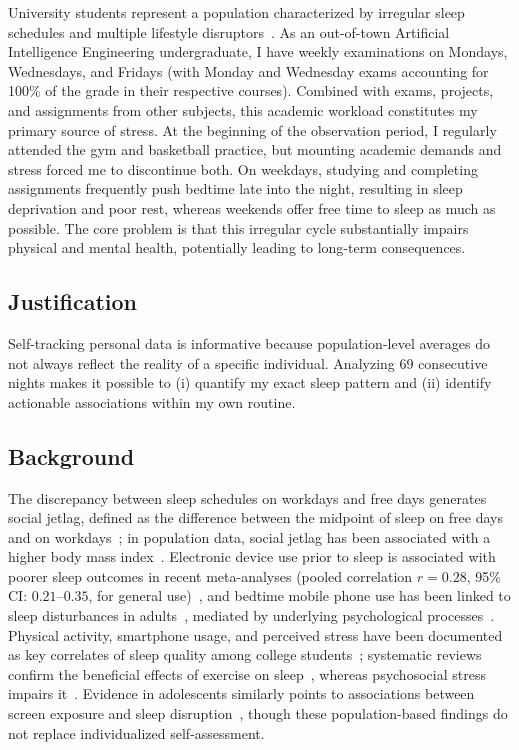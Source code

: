 \documentclass[conference]{IEEEtran}
\begin{document}
University students represent a population characterized by irregular sleep schedules and multiple lifestyle disruptors~\cite{ref5,ref6}. As an out-of-town Artificial Intelligence Engineering undergraduate, I have weekly examinations on Mondays, Wednesdays, and Fridays (with Monday and Wednesday exams accounting for 100\% of the grade in their respective courses). Combined with exams, projects, and assignments from other subjects, this academic workload constitutes my primary source of stress. At the beginning of the observation period, I regularly attended the gym and basketball practice, but mounting academic demands and stress forced me to discontinue both. On weekdays, studying and completing assignments frequently push bedtime late into the night, resulting in sleep deprivation and poor rest, whereas weekends offer free time to sleep as much as possible. The core problem is that this irregular cycle substantially impairs physical and mental health, potentially leading to long-term consequences.

\subsection{Justification}
Self-tracking personal data is informative because population-level averages do not always reflect the reality of a specific individual. Analyzing 69 consecutive nights makes it possible to (i) quantify my exact sleep pattern and (ii) identify actionable associations within my own routine.

\subsection{Background}
The discrepancy between sleep schedules on workdays and free days generates social jetlag, defined as the difference between the midpoint of sleep on free days and on workdays~\cite{ref8}; in population data, social jetlag has been associated with a higher body mass index~\cite{ref9}. Electronic device use prior to sleep is associated with poorer sleep outcomes in recent meta-analyses (pooled correlation $r=0.28$, 95\% CI: $0.21$--$0.35$, for general use)~\cite{ref10}, and bedtime mobile phone use has been linked to sleep disturbances in adults~\cite{ref11}, mediated by underlying psychological processes~\cite{ref12,ref13}. Physical activity, smartphone usage, and perceived stress have been documented as key correlates of sleep quality among college students~\cite{ref14,ref15}; systematic reviews confirm the beneficial effects of exercise on sleep~\cite{ref16}, whereas psychosocial stress impairs it~\cite{ref17}. Evidence in adolescents similarly points to associations between screen exposure and sleep disruption~\cite{ref18,ref19}, though these population-based findings do not replace individualized self-assessment.
\end{document}
